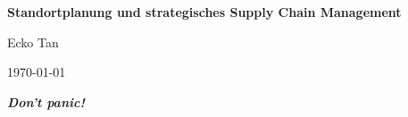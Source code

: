 \documentclass[a4paper,10pt]{book}
\theoremstyle{definition}
\theoremstyle{remark}
\theoremstyle{definition}
\theoremstyle{plain}
\theoremstyle{definition}
\begin{document}

  \begin{titlepage}
    \begin{flushright}

    \end{flushright}
    \vspace*{2cm} 
    \begin{center} \large
      {\Huge \bf Standortplanung und strategisches Supply Chain Management}
      \vspace*{2.5cm}
      
      Ecko Tan
      \vspace*{1.5cm}
      
      \today
      \vspace*{1.5cm}
    \end{center}
  \end{titlepage}

  \newpage

    \vspace*{\fill}
    \begin{center}
        \textbf{\Large \em Don't panic!}
    \end{center}
    \vspace*{\fill}
      
  \newpage
    \tableofcontents

  \newpage

  

  

  

  

  

  
      
 
\end{document}
